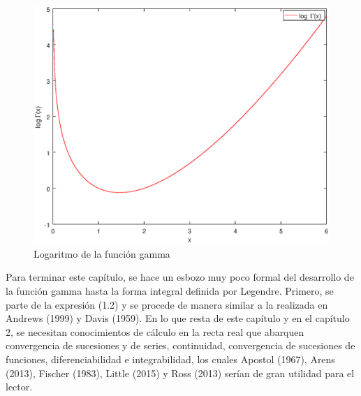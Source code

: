 \begin{figure}[htbp]
	\begin{center}
		\includegraphics[scale=0.5]{figura1_7.eps}
	\end{center}
\caption{Logaritmo de la función gamma}
\label{fig1_7}
\end{figure}

Para terminar este capítulo, se hace un esbozo muy poco formal del desarrollo de la función gamma hasta la forma integral definida por Legendre. Primero, se parte de la expresión (1.2) y se procede de manera similar a la realizada en Andrews (1999) y Davis (1959). En lo que resta de este capítulo y en el capítulo 2, se necesitan conocimientos de cálculo en la recta real que abarquen convergencia de sucesiones y de series, continuidad, convergencia de sucesiones de funciones, diferenciabilidad e integrabilidad, los cuales Apostol (1967), Arens (2013), Fischer (1983), Little (2015) y Ross (2013) serían de gran utilidad para el lector.

